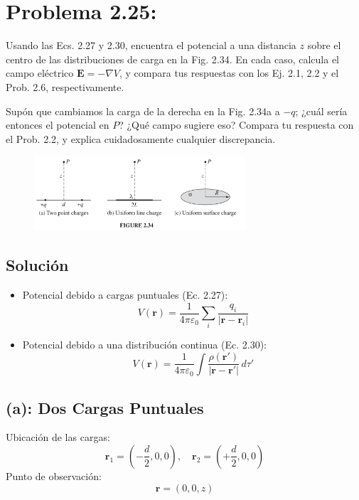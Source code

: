 \documentclass[12pt]{article}
\begin{document}



 \section*{Problema 2.25:} Usando las Ecs. 2.27 y 2.30, encuentra el potencial a una distancia $z$ sobre el centro de las distribuciones de carga en la Fig. 2.34. En cada caso, calcula el campo eléctrico $\mathbf{E} = -\nabla V$, y compara tus respuestas con los Ej. 2.1, 2.2 y el Prob. 2.6, respectivamente. 

Supón que cambiamos la carga de la derecha en la Fig. 2.34a a $-q$; ¿cuál sería entonces el potencial en $P$? ¿Qué campo sugiere eso? Compara tu respuesta con el Prob. 2.2, y explica cuidadosamente cualquier discrepancia.


\begin{figure}[h] 
    \centering
    \includegraphics[width=0.7\textwidth]{imagenes/problema_25.png}
    \captionsetup{labelformat=empty}
    \label{Esquema}
\end{figure}

\subsection*{Solución}
\begin{itemize}
    \item Potencial debido a cargas puntuales (Ec. 2.27):
    \[
        V(\mathbf{r}) = \frac{1}{4\pi\varepsilon_0} \sum_i \frac{q_i}{|\mathbf{r} - \mathbf{r}_i|}
    \]
    \item Potencial debido a una distribución continua (Ec. 2.30):
    \[
        V(\mathbf{r}) = \frac{1}{4\pi\varepsilon_0} \int \frac{\rho(\mathbf{r'})}{|\mathbf{r} - \mathbf{r'}|} \, d\tau'
    \]
\end{itemize}

\subsection*{(a): Dos Cargas Puntuales}

Ubicación de las cargas:
\[
\mathbf{r}_1 = \left(-\frac{d}{2}, 0, 0\right), \quad \mathbf{r}_2 = \left(+\frac{d}{2}, 0, 0\right)
\]
Punto de observación:
\[
\mathbf{r} = (0, 0, z)
\]
\end{document}
